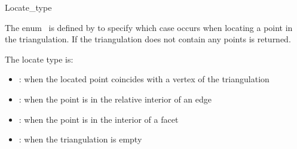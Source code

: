 
\ccModifierCrossRefOff
\begin{ccRefEnum}{Locate_type}

\ccDefinition
  
The enum \ccRefName\ is defined by  to
specify which case occurs when locating a point in the
triangulation. If the triangulation does not contain any points
 is returned.


The locate type is:
\begin{itemize}
%
\item{:} when the located point coincides with a vertex of the triangulation
%
\item{:} when the point is in the relative interior of an edge
%
\item{:} when the point is in the interior of a facet
%
\item{:} when the triangulation is empty
%
\end{itemize}


\ccSeeAlso


\end{ccRefEnum}
\ccModifierCrossRefOn
